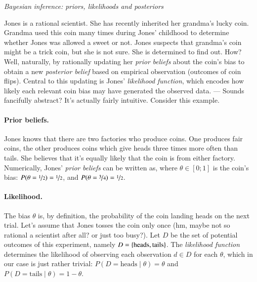 \documentclass[nobib]{tufte-handout}
\begin{document}
\begin{InfoBox}[]
\centering
\colorbox{mygray}{\centering
  \begin{minipage}{1.0\textwidth}

    \emph{Bayesian inference: priors, likelihoods and posteriors}
    \medskip

    Jones is a rational scientist. She has recently inherited her grandma's lucky coin. Grandma
    used this coin many times during Jones' childhood to determine whether Jones was allowed a
    sweet or not. Jones suspects that grandma's coin might be a trick coin, but she is not
    sure. She is determined to find out. How? Well, naturally, by rationally updating her
    \emph{prior beliefs} about the coin's bias to obtain a new \emph{posterior belief} based on
    empirical observation (outcomes of coin flips). Central to this updating is Jones'
    \emph{likelihood function}, which encodes how likely each relevant coin bias may have
    generated the observed data. --- Sounds fancifully abstract? It's actually fairly intuitive.
    Consider this example.
    
    \paragraph{Prior beliefs.} Jones knows that there are two factories who produce coins. One
    produces fair coins, the other produces coins which give heads three times more often than
    tails. She believes that it's equally likely that the coin is from either factory. Numerically, Jones' \emph{prior beliefs} can be written as, where $\theta \in [0;1]$
    is the coin's bias: $P(\theta = \nicefrac{1}{2}) = \nicefrac{1}{2}$, and $P(\theta =
    \nicefrac{3}{4}) = \nicefrac{1}{2}$.

    \paragraph{Likelihood.} The bias $\theta$ is, by definition, the probability of the coin
    landing heads on the next trial. Let's assume that Jones tosses the coin only once (hm,
    maybe not so rational a scientist after all? or just too busy?). Let $D$ be the set of
    potential outcomes of this experiment, namely $D = \left\{\text{heads}, \text{tails}\right\}$. The
    \emph{likelihood function} determines the likelihood of observing each observation $d \in D$ for
    each $\theta$, which in our case is just rather trivial: $P(D = \text{heads} \mid \theta) =
    \theta$ and $P(D = \text{tails} \mid \theta) = 1 - \theta$.


\end{minipage}}
\end{InfoBox}
\end{document}
